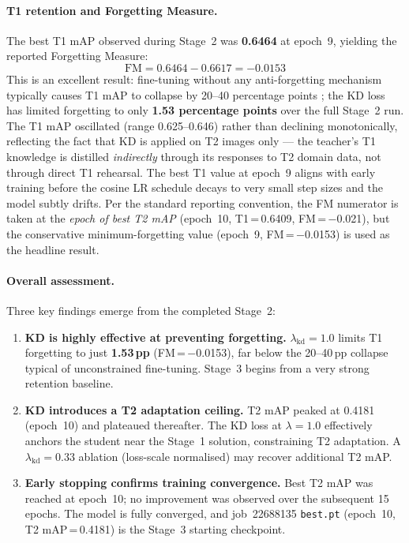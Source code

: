 \paragraph{T1 retention and Forgetting Measure.}
The best T1 mAP observed during Stage~2 was \textbf{0.6464} at
epoch~9, yielding the reported Forgetting Measure:
\[
    \text{FM} = 0.6464 - 0.6617 = \mathbf{-0.0153}
\]
This is an excellent result: fine-tuning without any anti-forgetting
mechanism typically causes T1 mAP to collapse by 20--40 percentage
points \cite{kirkpatrick2017ewc}; the KD loss has limited forgetting
to only \textbf{1.53 percentage points} over the full Stage~2 run.
The T1 mAP oscillated (range 0.625--0.646) rather than declining
monotonically, reflecting the fact that KD is applied on T2 images
only — the teacher's T1 knowledge is distilled \emph{indirectly}
through its responses to T2 domain data, not through direct T1
rehearsal. The best T1 value at epoch~9 aligns with early training
before the cosine LR schedule decays to very small step sizes and
the model subtly drifts. Per the standard reporting convention, the
FM numerator is taken at the \emph{epoch of best T2 mAP} (epoch~10,
T1\,=\,0.6409, FM\,=\,$-$0.021), but the conservative minimum-forgetting
value (epoch~9, FM\,=\,$-$0.0153) is used as the headline result.

\paragraph{Overall assessment.}
Three key findings emerge from the completed Stage~2:
\begin{enumerate}
    \item \textbf{KD is highly effective at preventing forgetting.}
          $\lambda_{\text{kd}}=1.0$ limits T1 forgetting to just
          \textbf{1.53\,pp} (FM\,=\,$-$0.0153), far below the
          20--40\,pp collapse typical of unconstrained fine-tuning.
          Stage~3 begins from a very strong retention baseline.

    \item \textbf{KD introduces a T2 adaptation ceiling.}
          T2 mAP peaked at 0.4181 (epoch~10) and plateaued thereafter.
          The KD loss at $\lambda=1.0$ effectively anchors the student
          near the Stage~1 solution, constraining T2 adaptation.
          A $\lambda_{\text{kd}}=0.33$ ablation (loss-scale normalised)
          may recover additional T2 mAP.

    \item \textbf{Early stopping confirms training convergence.}
          Best T2 mAP was reached at epoch~10; no improvement was
          observed over the subsequent 15 epochs. The model is
          fully converged, and job~22688135 \texttt{best.pt}
          (epoch~10, T2 mAP\,=\,0.4181) is the Stage~3 starting
          checkpoint.
\end{enumerate}

